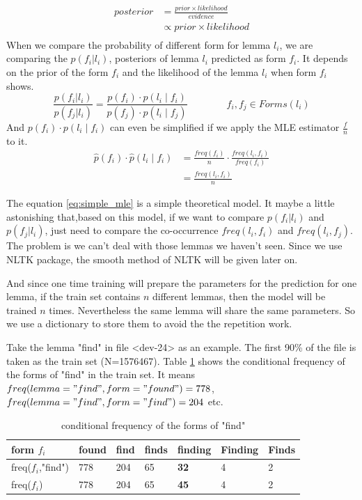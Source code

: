 \documentclass[a4paper]{article}
\begin{document}
\begin{align*}
posterior  &= \frac{prior \times likelihood}{evidence} \\
           &\propto  prior \times likelihood \\
\end{align*}
When we compare the probability of different form for lemma $l_i$, we are comparing the $p(f_i|l_i)$, posteriors  of lemma $l_i$ predicted as form $f_i$. It depends on the prior of the form $f_i$ and the likelihood of the lemma $l_i$ when form $f_i$ shows.
\begin{equation}
\frac{p(f_i|l_i)}{p(f_j|l_i)} = \frac{p(f_i) \cdot p(l_i \mid f_i)}{  p(f_j) \cdot p(l_i \mid f_j) } \qquad \qquad  f_i,f_j \in Forms(l_i)
\end{equation}
And $p(f_i) \cdot p(l_i \mid f_i)$ can even be simplified if we apply the MLE estimator $\frac{f}{n}$ to it.
\begin{equation} 
\label{eq:simple_mle}
\begin{aligned}
\hat{p}(f_i) \cdot \hat{p}(l_i \mid f_i) &= \frac{freq(f_i)}{n} \cdot \frac{freq(l_i, f_i)}{freq(f_i)} \\
&= \frac{freq(l_i, f_i)}{n}
\end{aligned}
\end{equation}

The equation \ref{eq:simple_mle} is a simple theoretical model. It maybe a little astonishing that,based on this model, if we want to compare $p(f_i|l_i)$ and $p(f_j|l_i)$, just need to compare the co-occurrence $freq(l_i,f_i)$ and $freq(l_i,f_j)$.  The problem is we can't deal with those lemmas we haven't seen. Since we use NLTK package, the smooth method of NLTK will be given later on. 

And since one time training will prepare the parameters for the prediction for one lemma, if the train set contains $n$ different lemmas, then the model will be trained $n$ times. Nevertheless the same lemma will share the same parameters. So we use a dictionary to store them to avoid the the repetition work.


Take the lemma "find" in file <dev-24> as an example. The first 90\% of the file is taken as the train set (N=1576467). Table \ref{tb:cfd_find} shows the conditional frequency of the forms of "find" in the train set. It means $freq(lemma="find", form="found")=778$, $freq(lemma="find",form="find")=204$ etc.

\begin{table}[htb]
\centering
\begin{tabular}{|l|llllll|}
\hline
form $f_i$       & found & find & finds & finding & Finding & Finds \\ \hline
freq($f_i$,"find") & 778   & 204  & 65    & \textbf{32}      & 4       & 2     \\ \hline
freq($f_i$) & 778   & 204  & 65    & \textbf{45}      & 4       & 2     \\ \hline
\end{tabular}
\caption{conditional frequency of the forms of "find"}
\label{tb:cfd_find}
\end{table}
\end{document}

